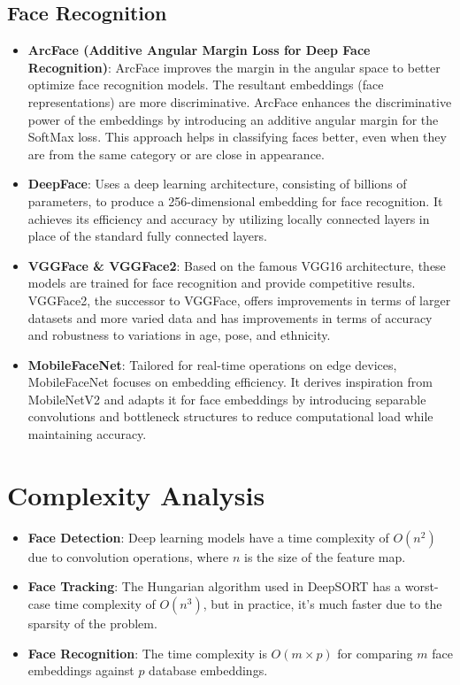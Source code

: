 	\subsection{Face Recognition}
		\begin{itemize}
			\item \textbf{ArcFace (Additive Angular Margin Loss for Deep Face Recognition)}: ArcFace improves the margin in the angular space to better optimize face recognition models. The resultant embeddings (face representations) are more discriminative. ArcFace enhances the discriminative power of the embeddings by introducing an additive angular margin for the SoftMax loss. This approach helps in classifying faces better, even when they are from the same category or are close in appearance.
			\item \textbf{DeepFace}: Uses a deep learning architecture, consisting of billions of parameters, to produce a 256-dimensional embedding for face recognition. It achieves its efficiency and accuracy by utilizing locally connected layers in place of the standard fully connected layers.
			\item \textbf{VGGFace \& VGGFace2}: Based on the famous VGG16 architecture, these models are trained for face recognition and provide competitive results. VGGFace2, the successor to VGGFace, offers improvements in terms of larger datasets and more varied data and has improvements in terms of accuracy and robustness to variations in age, pose, and ethnicity.
			\item \textbf{MobileFaceNet}: Tailored for real-time operations on edge devices, MobileFaceNet focuses on embedding efficiency. It derives inspiration from MobileNetV2 and adapts it for face embeddings by introducing separable convolutions and bottleneck structures to reduce computational load while maintaining accuracy.
		\end{itemize}

\section{Complexity Analysis}
	\begin{itemize}
		\item \textbf{Face Detection}: Deep learning models have a time complexity of \( O(n^2) \) due to convolution operations, where \( n \) is the size of the feature map.
		\item \textbf{Face Tracking}: The Hungarian algorithm used in DeepSORT has a worst-case time complexity of \( O(n^3) \), but in practice, it's much faster due to the sparsity of the problem.
		\item \textbf{Face Recognition}: The time complexity is \( O(m \times p) \) for comparing \( m \) face embeddings against \( p \) database embeddings.
	\end{itemize}

